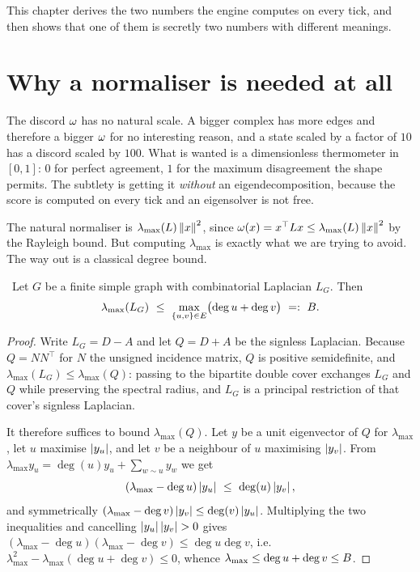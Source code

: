 \begin{workplan}{\Recast}
\end{workplan}

This chapter derives the two numbers the engine computes on every tick,
and then shows that one of them is secretly two numbers with different
meanings.

\section{Why a normaliser is needed at all}

\begin{intu}\Intu
The discord $\omega$ has no natural scale. A bigger complex has more
edges and therefore a bigger $\omega$ for no interesting reason, and a
state scaled by a factor of $10$ has a discord scaled by $100$. What is
wanted is a dimensionless thermometer in $[0,1]$: $0$ for perfect
agreement, $1$ for the maximum disagreement the shape permits. The
subtlety is getting it \emph{without} an eigendecomposition, because the
score is computed on every tick and an eigensolver is not free.
\end{intu}

The natural normaliser is $\lambda_{\max}(L)\left\lVert x \right\rVert^2$, since
$\omega(x)=x^\top L x\le\lambda_{\max}(L)\left\lVert x \right\rVert^2$ by the
Rayleigh bound. But computing $\lambda_{\max}$ is exactly what we are
trying to avoid. The way out is a classical degree bound.

\begin{theorem}\label{thm:AM}
\Proved\ Let $G$ be a finite simple graph with combinatorial Laplacian
$L_G$. Then
\begin{equation}\label{eq:AMbound}
  \lambda_{\max}(L_G)\ \le\ \max_{\{u,v\}\in E}\bigl(\deg u+\deg v\bigr)
  \ =:\ B .
\end{equation}
\end{theorem}
\begin{proof}
Write $L_G=D-A$ and let $Q=D+A$ be the signless Laplacian. Because
$Q=NN^\top$ for $N$ the unsigned incidence matrix, $Q$ is positive
semidefinite, and $\lambda_{\max}(L_G)\le\lambda_{\max}(Q)$: passing to
the bipartite double cover exchanges $L_G$ and $Q$ while preserving the
spectral radius, and $L_G$ is a principal restriction of that cover's
signless Laplacian.

It therefore suffices to bound $\lambda_{\max}(Q)$. Let $y$ be a unit
eigenvector of $Q$ for $\lambda_{\max}$, let $u$ maximise $\left\lvert y_u \right\rvert$,
and let $v$ be a neighbour of $u$ maximising $\left\lvert y_v \right\rvert$. From
$\lambda_{\max}y_u=\deg(u)y_u+\sum_{w\sim u}y_w$ we get
\[
  (\lambda_{\max}-\deg u)\abs{y_u}\ \le\ \deg(u)\abs{y_v},
\]
and symmetrically $(\lambda_{\max}-\deg v)\left\lvert y_v \right\rvert\le\deg(v)\left\lvert y_u \right\rvert$.
Multiplying the two inequalities and cancelling $\left\lvert y_u \right\rvert\left\lvert y_v \right\rvert>0$
gives
$(\lambda_{\max}-\deg u)(\lambda_{\max}-\deg v)\le\deg u\deg v$, i.e.
$\lambda_{\max}^2-\lambda_{\max}(\deg u+\deg v)\le0$, whence
$\lambda_{\max}\le\deg u+\deg v\le B$.
\end{proof}

